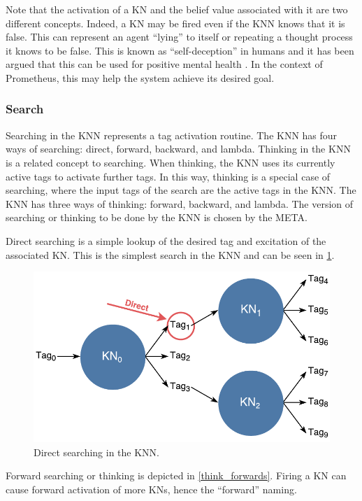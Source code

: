 \documentclass[titlepage,11pt]{article}
\begin{document}
Note that the activation of a KN and the belief value associated with it are two different concepts. Indeed, a KN may be fired even if the KNN knows that it is false. This can represent an agent ``lying'' to itself or repeating a thought process it knows to be false. This is known as ``self-deception'' in humans and it has been argued that this can be used for positive mental health \cite{taylor1989positive}. In the context of Prometheus, this may help the system achieve its desired goal.

\subsubsection{Search}
Searching in the KNN represents a tag activation routine. The KNN has four ways of searching: direct, forward, backward, and lambda. Thinking in the KNN is a related concept to searching. When thinking, the KNN uses its currently active tags to activate further tags. In this way, thinking is a special case of searching, where the input tags of the search are the active tags in the KNN. The KNN has three ways of thinking: forward, backward, and lambda. The version of searching or thinking to be done by the KNN is chosen by the META. 

Direct searching is a simple lookup of the desired tag and excitation of the associated KN. This is the simplest search in the KNN and can be seen in \cref{fig:direct_search}.

\begin{figure}[!htb]
	\includegraphics[width=\columnwidth]{figures/direct_search.pdf}
	\caption{Direct searching in the KNN.}
	\label{fig:direct_search}
\end{figure}

Forward searching or thinking is depicted in \autoref{think_forwards}. Firing a KN can cause forward activation of more KNs, hence the ``forward'' naming.
\end{document}
